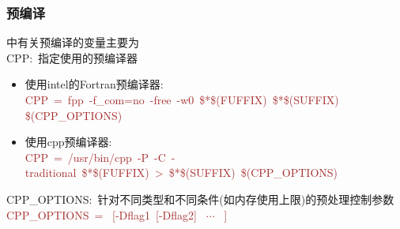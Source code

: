 \subsubsection{\rm{预编译}}
中有关预编译的变量主要为\\
\textrm{CPP}:~指定使用的预编译器
\begin{itemize}
	\item 使用\textrm{intel}的\textrm{Fortran}预编译器:\\
		\textcolor{brown}{\textrm{CPP~=~fpp~-f\_com=no~-free~-w0~\$*\$(FUFFIX)~\$*\$(SUFFIX) \$(CPP\_OPTIONS)}}
	\item 使用\textrm{cpp}预编译器:\\
		\textcolor{brown}{\textrm{CPP~=~/usr/bin/cpp~-P~-C~-traditional~\$*\$(FUFFIX)~>~\$*\$(SUFFIX)~\$(CPP\_OPTIONS)}}
\end{itemize}
\textrm{CPP\_OPTIONS}:~针对不同类型和不同条件(如内存使用上限)的预处理控制参数\\
	\textcolor{brown}{\textrm{CPP\_OPTIONS~= ~[-Dflag1~[-Dflag2]~ $\cdots$~ ]}}
